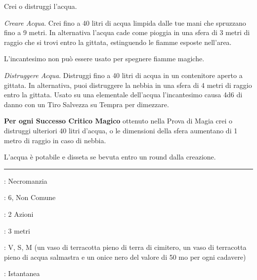 \begin{multicols}{2}
Crei o distruggi l'acqua.

\emph{Creare Acqua}. Crei fino a 40 litri di acqua limpida dalle tue mani che spruzzano fino a 9 metri. In alternativa l'acqua cade come pioggia in una sfera di 3 metri di raggio che si trovi entro la gittata, estinguendo le fiamme esposte nell'area.

L'incantesimo non può essere usato per spegnere fiamme magiche.

\emph{Distruggere Acqua}. Distruggi fino a 40 litri di acqua in un contenitore aperto a gittata. In alternativa, puoi distruggere la nebbia in una sfera di 4 metri di raggio entro la gittata. Usato su una elementale dell'acqua l'incantesimo causa 4d6 di danno con un Tiro Salvezza su Tempra per dimezzare.

\textbf{Per ogni Successo Critico Magico} ottenuto nella Prova di Magia crei o distruggi ulteriori 40 litri d'acqua, o le dimensioni della sfera aumentano di 1 metro di raggio in caso di nebbia.

L'acqua è potabile e disseta se bevuta entro un round dalla creazione.

\smallskip\noindent\rule{\linewidth}{2pt} \hypertarget{Creare Non Morti}{}\medskip{}
\noindent
\begin{description}[noitemsep, topsep=0pt, parsep=0pt, partopsep=0pt, leftmargin=0cm, labelwidth=2.8cm]
	\item[\textbf{Lista di Magia}]: Necromanzia
	\item[\textbf{Livello}]: 6, Non Comune
	\item[\textbf{T. di Lancio}]: 2 Azioni
	\item[\textbf{Gittata}]: 3 metri
	\item[\textbf{Componenti}]: V, S, M (un vaso di terracotta pieno di terra di cimitero, un vaso di terracotta pieno di acqua salmastra e un onice nero del valore di 50 mo per ogni cadavere)
	\item[\textbf{Durata}]: Istantanea
\end{description}


\end{multicols}

